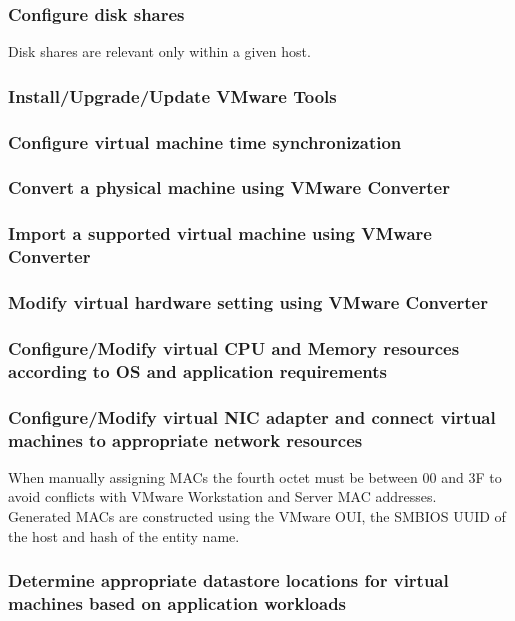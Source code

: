 \subsubsection{Configure disk shares}

Disk shares are relevant only within a given host.

\subsubsection{Install/Upgrade/Update VMware Tools}

\subsubsection{Configure virtual machine time synchronization}

\subsubsection{Convert a physical machine using VMware Converter}

\subsubsection{Import a supported virtual machine using VMware Converter}

\subsubsection{Modify virtual hardware setting using VMware Converter}

\subsubsection{Configure/Modify virtual CPU and Memory resources according to OS and application requirements}

\subsubsection{Configure/Modify virtual NIC adapter and connect virtual machines to appropriate network resources}

When manually assigning MACs the fourth octet must be between 00 and 3F to
avoid conflicts with VMware Workstation and Server MAC addresses.\\

Generated MACs are constructed using the VMware OUI, the SMBIOS UUID of the
host and hash of the entity name.

\subsubsection{Determine appropriate datastore locations for virtual machines based on application workloads}
